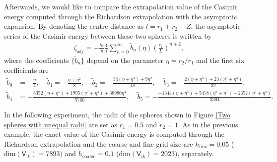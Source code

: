 Afterwards, we would like to compare the extrapolation value of the Casimir energy computed through the Richardson extrapolation with the asymptotic expansion. By denoting the centre distance as
$l = r_{1} + r_{2} + Z$, the asymptotic series of the Casimir energy between these two spheres is written by
\begin{align}\label{Asymptotic unequal radii}
    \zeta_{\text{asy}} = -\frac{\hbar c}{\pi}\frac{1}{l}\sum_{n=0}^{\infty}\tilde{b}_{n}(\eta)\left(\frac{r_{1}}{L}\right)^{n+2},
\end{align}
where the coefficients $\{\tilde{b}_{n}\}$ depend on the parameter $\eta = r_{2}/r_{1}$ and the first six coefficients are
\begin{align*}
    \tilde{b}_{0} &= -\frac{\eta}{4}, \ \ \ \ \ \tilde{b}_{1} = -\frac{\eta + \eta^{2}}{8}, \ \ \ \ \  \tilde{b}_{2} = -\frac{34(\eta+\eta^{3})+ 9\eta^{2}}{48}, \ \ \ \ \ \tilde{b}_{3} = -\frac{2(\eta+\eta^{4}) + 23(\eta^{2} + \eta^{3})}{32}, \\ 
    \tilde{b}_{4} &= -\frac{8352(\eta + \eta^{5})+ 1995(\eta^{2} + \eta^{4}) + 38980\eta^{3}}{5760}, \ \ \ \ \ \tilde{b}_{5} = -\frac{-1344(\eta+\eta^{6}) + 5478(\eta^{2} + \eta^{5})+2357(\eta^{3} + \eta^{4})}{2304}.
\end{align*}

In the following experiment, the radii of the spheres shown in Figure \ref{Two spheres with unequal radii} are set as $r_{1} = 0.5$ and $ r_{2} = 1$. 
As in the previous example, the exact value of the Casimir energy is computed through the Richardson extrapolation and the coarse and fine grid size are $h_{\text{fine}} = 0.05$ ($\text{dim}(\mathsf{V}_{\mathrm{i}k}) = 7893)$ and 
$h_{\text{coarse}} = 0.1$ ($\text{dim}(\mathsf{V}_{\mathrm{i}k}) = 2023)$, separately. 

